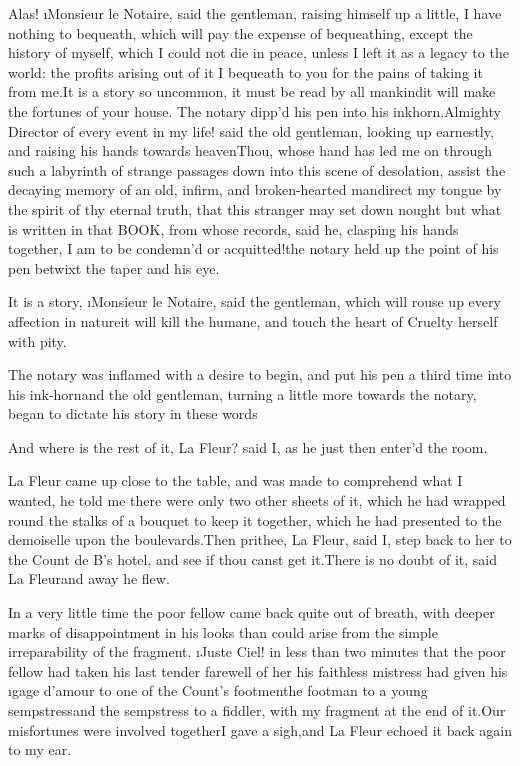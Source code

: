 \documentclass[twoside]{article}
\begin{document}
Alas!  \i{Monsieur le Notaire}, said the
gentleman, raising himself up a little, I
have nothing to bequeath, which will pay
the expense of bequeathing, except the
history of myself, which I could not die
in peace, unless I left it as a legacy to
the world: the profits arising out of it I
bequeath to you for the pains of taking it
from me.\tskk It is a story so uncommon,
it must be read by all mankind\tskk it
will make the fortunes of your house.\tskk
The notary dipp’d his pen into his
inkhorn.\tskk Almighty Director of every
event in my life! said the old gentleman,
looking up earnestly, and raising his
hands towards heaven\tskk Thou, whose
hand has led me on through such a
labyrinth of strange passages down into
this scene of desolation, assist the
decaying memory of an old, infirm, and
broken-hearted man\tskk direct my tongue
by the spirit of thy eternal truth, that
this stranger may set down nought but what
is written in that BOOK, from whose
records, said he, clasping his hands
together, I am to be condemn’d or
acquitted!\tskk the notary held up the
point of his pen betwixt the taper and his
eye.\tskk 

It is a story, \i{Monsieur le Notaire},
said the gentleman, which will rouse up
every affection in nature\tskk it will
kill the humane, and touch the heart of
Cruelty herself with pity.\tskk 

\tskk The notary was inflamed with a
desire to begin, and put his pen a third
time into his ink-horn\tskk and the old
gentleman, turning a little more towards
the notary, began to dictate his story in
these words\tskk 

\tskk And where is the rest of it, La
Fleur? said I, as he just then enter’d the
room.




 

 La Fleur came up close to
the table, and was made to comprehend what
I wanted, he told me there were only two
other sheets of it, which he had wrapped
round the stalks of a bouquet to keep it
together, which he had presented to the
demoiselle upon the boulevards.\tskk Then
prithee, La Fleur, said I, step back to
her to the Count de B\anon’s hotel, and
see if thou canst get it.\tskk There is no
doubt of it, said La Fleur\tskk and away
he flew.

In a very little time the poor fellow came
back quite out of breath, with deeper
marks of disappointment in his looks than
could arise from the simple irreparability
of the fragment.  \i{Juste Ciel}! in less
than two minutes that the poor fellow had
taken his last tender farewell of her\tskk
his faithless mistress had given his
\i{gage d’amour} to one of the Count’s
footmen\tskk the footman to a young
sempstress\tskk and the sempstress to a
fiddler, with my fragment at the end of
it.\tskk Our misfortunes were involved
together\tskk I gave a sigh,\tskk and La
Fleur echoed it back again to my ear.
\end{document}
